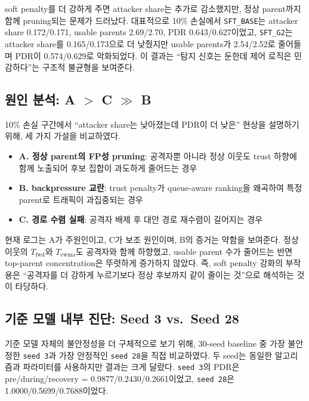 \documentclass[12pt,a4paper]{article}
\begin{document}
soft penalty를 더 강하게 주면 attacker share는 추가로 감소했지만,
정상 parent까지 함께 pruning되는 문제가 드러났다.
대표적으로 10\% 손실에서 \texttt{SFT\_BASE}는 attacker share 0.172/0.171,
usable parents 2.69/2.70, PDR 0.643/0.627이었고,
\texttt{SFT\_G2}는 attacker share를 0.165/0.173으로 더 낮췄지만
usable parents가 2.54/2.52로 줄어들며 PDR이 0.574/0.629로 악화되었다.
이 결과는 ``탐지 신호는 둔한데 제어 로직은 민감하다''는 구조적 불균형을 보여준다.

\subsection{원인 분석: A $>$ C $\gg$ B}

10\% 손실 구간에서 ``attacker share는 낮아졌는데 PDR이 더 낮은'' 현상을 설명하기 위해,
세 가지 가설을 비교하였다.
\begin{itemize}
  \item \textbf{A. 정상 parent의 FP성 pruning}: 공격자뿐 아니라 정상 이웃도 trust 하향에 함께 노출되어
  후보 집합이 과도하게 줄어드는 경우
  \item \textbf{B. backpressure 교란}: trust penalty가 queue-aware ranking을 왜곡하여
  특정 parent로 트래픽이 과집중되는 경우
  \item \textbf{C. 경로 수렴 실패}: 공격자 배제 후 대안 경로 재수렴이 길어지는 경우
\end{itemize}

현재 로그는 A가 주원인이고, C가 보조 원인이며, B의 증거는 약함을 보여준다.
정상 이웃의 $T_\text{fwd}$와 $T_\text{ewma}$도 공격자와 함께 하향했고,
usable parent 수가 줄어드는 반면 top-parent concentration은 뚜렷하게 증가하지 않았다.
즉, soft penalty 강화의 부작용은 ``공격자를 더 강하게 누르기보다
정상 후보까지 같이 줄이는 것''으로 해석하는 것이 타당하다.

\subsection{기준 모델 내부 진단: Seed 3 vs.\ Seed 28}

기준 모델 자체의 불안정성을 더 구체적으로 보기 위해,
30-seed baseline 중 가장 불안정한 \texttt{seed 3}과 가장 안정적인 \texttt{seed 28}을 직접 비교하였다.
두 seed는 동일한 알고리즘과 파라미터를 사용하지만 결과는 크게 달랐다.
\texttt{seed 3}의 PDR은 pre/during/recovery = 0.9877/0.2430/0.2661이었고,
\texttt{seed 28}은 1.0000/0.5699/0.7688이었다.
\end{document}
